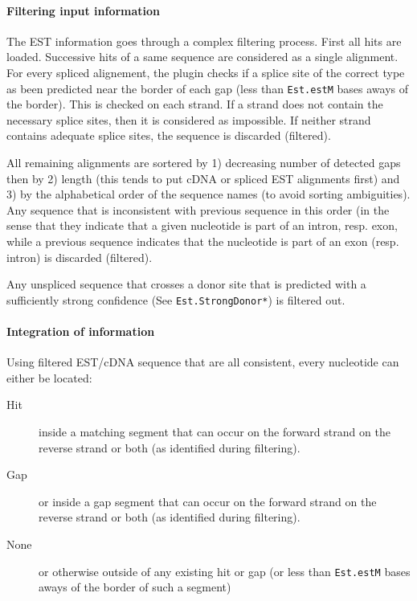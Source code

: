 \paragraph{Filtering input information}

The EST information goes through a complex filtering process. First
all hits are loaded. Successive hits of a same sequence are considered
as a single alignment.  For every spliced alignement, the plugin
checks if a splice site of the correct type as been predicted near the
border of each gap (less than \texttt{Est.estM} bases aways of the
border). This is checked on each strand. If a strand does not contain
the necessary splice sites, then it is considered as impossible. If
neither strand contains adequate splice sites, the sequence is
discarded (filtered).

All remaining alignments are sortered by 1) decreasing number of
detected gaps then by 2) length (this tends to put cDNA or spliced EST
alignments first) and 3) by the alphabetical order of the sequence
names (to avoid sorting ambiguities). Any sequence that is
inconsistent with previous sequence in this order (in the sense that
they indicate that a given nucleotide is part of an intron, resp.
exon, while a previous sequence indicates that the nucleotide is part
of an exon (resp. intron) is discarded (filtered).

Any unspliced sequence that crosses a donor site that is predicted
with a sufficiently strong confidence (See \texttt{Est.StrongDonor*})
is filtered out.

\paragraph{Integration of information}

Using filtered EST/cDNA sequence that are all consistent, every
nucleotide can either be located:
\begin{description}
\item[Hit] inside a matching segment that can occur on the forward strand
  on the reverse strand or both (as identified during filtering).
\item[Gap] or inside a gap segment that can occur on the forward strand
  on the reverse strand or both (as identified during filtering).
\item[None] or otherwise outside of any existing hit or gap (or less
  than \texttt{Est.estM} bases aways of the border of such a segment)
\end{description}

